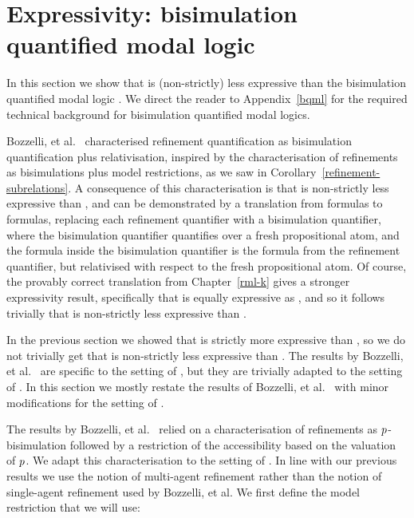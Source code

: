 \section{Expressivity: bisimulation quantified modal logic}\label{rml-k4-bqml}

In this section we show that \logicRmlKF{} is (non-strictly) less expressive than the bisimulation quantified modal logic \logicBqmlKF{}.
We direct the reader to Appendix~\ref{bqml} for the required technical background for bisimulation quantified modal logics.

Bozzelli, et al.~\cite{bozzelli:2014b} characterised refinement quantification as bisimulation quantification plus relativisation, inspired by the characterisation of refinements as bisimulations plus model restrictions, as we saw in Corollary~\ref{refinement-subrelations}.
A consequence of this characterisation is that \logicRmlK{} is non-strictly less expressive than \logicBqmlK{}, and can be demonstrated by a translation from \langRml{} formulas to \langBqml{} formulas, replacing each refinement quantifier with a bisimulation quantifier, where the bisimulation quantifier quantifies over a fresh propositional atom, and the formula inside the bisimulation quantifier is the formula from the refinement quantifier, but relativised with respect to the fresh propositional atom.
Of course, the provably correct translation from Chapter~\ref{rml-k} gives a stronger expressivity result, specifically that \logicRmlK{} is equally expressive as \logicK{}, and so it follows trivially that \logicRmlK{} is non-strictly less expressive than \logicBqmlK{}.

In the previous section we showed that \logicRmlKF{} is strictly more expressive than \logicKF{}, so we do not trivially get that \logicRmlKF{} is non-strictly less expressive than \logicBqmlKF{}.
The results by Bozzelli, et al.~\cite{bozzelli:2014b} are specific to the setting of \classK{}, but they are trivially adapted to the setting of \classKF{}.
In this section we mostly restate the results of Bozzelli, et al.~\cite{bozzelli:2014b} with minor modifications for the setting of \classKF{}.

The results by Bozzelli, et al.~\cite{bozzelli:2014b} relied on a characterisation of refinements as $p$-bisimulation followed by a restriction of the accessibility based on the valuation of $p$.
We adapt this characterisation to the setting of \classKF{}.
In line with our previous results we use the notion of multi-agent refinement rather than the notion of single-agent refinement used by Bozzelli, et al.
We first define the model restriction that we will use:

